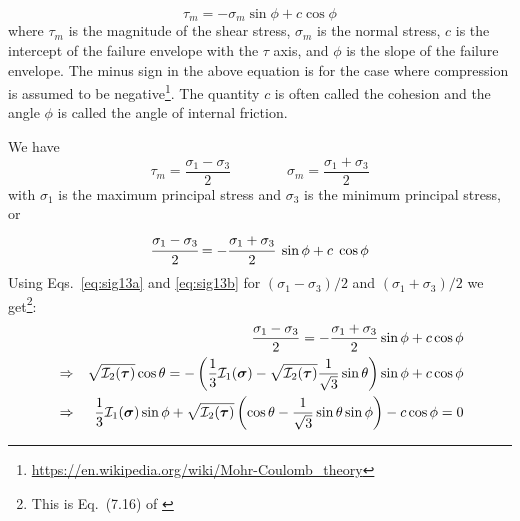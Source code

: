 

\begin{equation}
\tau_m = -\sigma_m \sin \phi + c \cos \phi  \label{eq:mccrit}
\end{equation}
where $\tau_m$ is the magnitude of the shear stress, 
$\sigma_m$ is the normal stress, $c$ is the intercept of the failure envelope with the $\tau$ axis, 
and $\phi$ is the slope of the failure envelope.
The minus sign in the above equation is for the case where compression is assumed to be 
negative\footnote{\url{https://en.wikipedia.org/wiki/Mohr-Coulomb_theory}}.
The quantity $c$ is often called the cohesion and the angle $\phi$ is called the angle of internal friction.
 
We have  
\[
\tau_m=\frac{\sigma_1-\sigma_3}{2}
\qquad
\qquad
\sigma_m = \frac{\sigma_1+\sigma_3}{2}
\]
with $\sigma_1$ is the maximum principal stress and $\sigma_3$ is the minimum principal stress, or
\begin{equation}
\cfrac{\sigma_1-\sigma_3}{2} = -\cfrac{\sigma_1+\sigma_3}{2}~\sin\phi +c\; \cos\phi 
\end{equation}
Using Eqs.~\eqref{eq:sig13a} and \eqref{eq:sig13b} 
for $(\sigma_1 - \sigma_3 )/2$ and $(\sigma_1 + \sigma_3 )/2$ we get\footnote{This is 
Eq.~(7.16) of \textcite{owhi}}:
\begin{eqnarray}
&& \frac{\sigma_1 - \sigma_3}{2} = -\frac{\sigma_1 + \sigma_3}{2} \sin \phi  + c \cos \phi \nonumber\\
&\Rightarrow&
\sqrt{  {\cal I}_2({\bm \tau}) } \cos \theta = -\left(\frac{1}{3}{\cal I}_1({\bm \sigma}) - \sqrt{  {\cal I}_2({\bm \tau})} \frac{1}{\sqrt{3}} \sin \theta \right) \sin \phi 
+ c \cos \phi \nonumber\\
&\Rightarrow&
\frac{1}{3} {\cal I}_1({\bm \sigma}) \sin \phi  
+ \sqrt{  {\cal I}_2({\bm \tau}) } \left( \cos \theta - \frac{1}{\sqrt{3}} \sin \theta  \sin \phi \right) - c \cos \phi = 0 \nonumber
\end{eqnarray}

